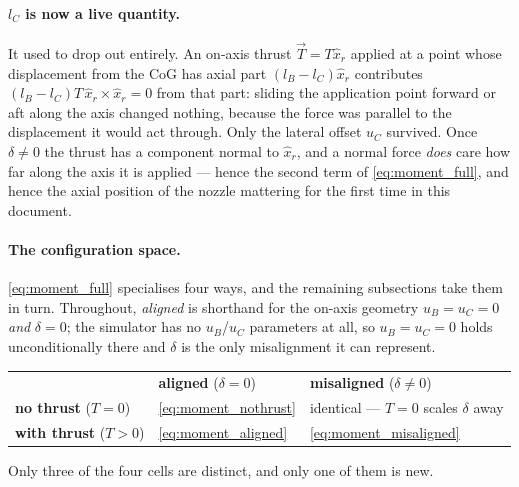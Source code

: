 {\paragraph{$l_C$ is now a live quantity.} It used to drop out entirely. An on-axis thrust
$\vec{T} = T\hat{x}_r$ applied at a point whose displacement from the CoG has axial part
$(l_B-l_C)\hat{x}_r$ contributes $(l_B-l_C)T\,\hat{x}_r\times\hat{x}_r = 0$ from that part:
sliding the application point forward or aft along the axis changed nothing, because the force
was parallel to the displacement it would act through. Only the lateral offset $u_C$ survived.
Once $\delta \neq 0$ the thrust has a component normal to $\hat{x}_r$, and a normal force
\emph{does} care how far along the axis it is applied --- hence the second term of
\autoref{eq:moment_full}, and hence the axial position of the nozzle mattering for the first
time in this document.

\paragraph{The configuration space.} \autoref{eq:moment_full} specialises four ways, and the
remaining subsections take them in turn. Throughout, \emph{aligned} is shorthand for the
on-axis geometry $u_B = u_C = 0$ \emph{and} $\delta = 0$; the simulator has no $u_B$/$u_C$
parameters at all, so $u_B = u_C = 0$ holds unconditionally there and $\delta$ is the only
misalignment it can represent.
\begin{center}
\begin{tabular}{l l l}
 & \textbf{aligned} ($\delta = 0$) & \textbf{misaligned} ($\delta \neq 0$) \\
\textbf{no thrust} ($T=0$) & \autoref{eq:moment_nothrust} & identical --- $T=0$ scales $\delta$ away \\
\textbf{with thrust} ($T>0$) & \autoref{eq:moment_aligned} & \autoref{eq:moment_misaligned} \\
\end{tabular}
\end{center}
Only three of the four cells are distinct, and only one of them is new.}

